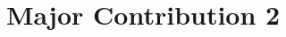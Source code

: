 \documentclass[oneside,openright,titlepage,numbers=noenddot,headinclude,footinclude=true,cleardoublepage=empty,listof=totoc,paper=a4,fontsize=11pt,american,BCOR=5mm]{scrreprt}
\begin{document}
  \frenchspacing
  \raggedbottom
  
  \pagestyle{plain}
  
  \singlespacing
  
  
  
  
  
  \cleardoublepage
  \pagestyle{scrheadings}
  \onehalfspacing
  
  
  
  
  
  \chapter{Major Contribution 2}\label{c:Contribution-2}
  
\end{document}
